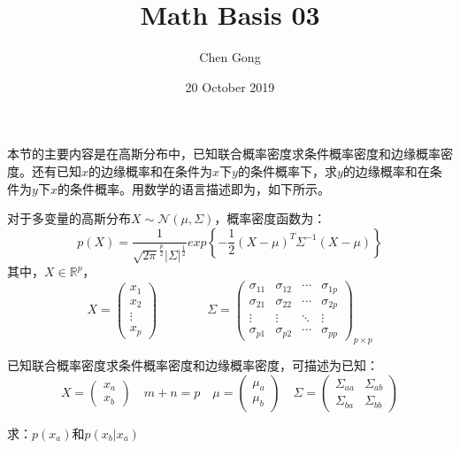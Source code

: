 \documentclass[a4paper]{article}
\title{Math Basis 03}
\author{Chen Gong}
\date{20 October 2019}
\begin{document}
\maketitle
本节的主要内容是在高斯分布中，已知联合概率密度求条件概率密度和边缘概率密度。还有已知$x$的边缘概率和在条件为$x$下$y$的条件概率下，求$y$的边缘概率和在条件为$y$下$x$的条件概率。用数学的语言描述即为，如下所示。

对于多变量的高斯分布$X\sim \mathcal{N}(\mu,\Sigma)$，概率密度函数为：
\begin{equation}
    p(X)=\frac{1}{\sqrt{2\pi}^{\frac{p}{2}}|\Sigma|^{\frac{1}{2}}}exp\left\{ -\frac{1}{2}(X-\mu)^T\Sigma^{-1}(X-\mu) \right\}
\end{equation}
其中，$X\in\mathbb{R}^p$，
\begin{equation}
    X=
    \begin{pmatrix}
        x_1 \\
        x_2 \\
        \vdots \\
        x_p
    \end{pmatrix} \qquad \qquad
    \Sigma = 
    \begin{pmatrix}
        \sigma_{11} & \sigma_{12} & \cdots & \sigma_{1p} \\
        \sigma_{21} & \sigma_{22} & \cdots & \sigma_{2p} \\
        \vdots      & \vdots      & \ddots & \vdots      \\
        \sigma_{p1} & \sigma_{p2} & \cdots & \sigma_{pp}
        \end{pmatrix}_{p\times p}
\end{equation}

已知联合概率密度求条件概率密度和边缘概率密度，可描述为已知：
\begin{equation}
    X= 
    \begin{pmatrix}
        x_a \\
        x_b
    \end{pmatrix}
    \quad m+n=p \quad
    \mu=
    \begin{pmatrix}
        \mu_a \\
        \mu_b
    \end{pmatrix} \quad
    \Sigma=
    \begin{pmatrix}
    \Sigma_{aa} & \Sigma_{ab} \\
    \Sigma_{ba} & \Sigma_{bb} 
    \end{pmatrix}
\end{equation}

求：$p(x_a)$和$p(x_b|x_a)$
\end{document}
